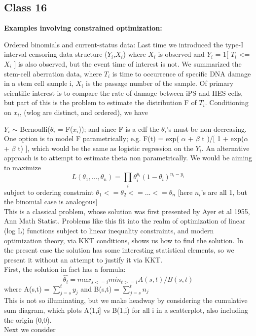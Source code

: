 \documentclass[11pt,a4paper]{article}
\begin{document}
\subsection*{Class 16}

\textbf{Examples involving constrained optimization:}


Ordered binomials and current-status data:  Last time we introduced the type-I interval censoring data structure { ($Y_i$,$X_i$) } where $X_i$ is observed and $Y_i$ = 1[ $T_i$ <= $X_i$ ] is also observed, but the event time of interest is not.  We summarized the stem-cell aberration data, where $T_i$ is time to occurrence of specific DNA damage in a stem cell sample i, $X_i$ is the passage number of the sample.  Of primary scientific interest is to compare the rate of damage between iPS and HES cells, but part of this is the problem to estimate the distribution F of $T_i$.   Conditioning on {$x_i$}, (wlog are distinct, and ordered), we have 

$Y_i$ $\sim$ Bernoulli($\theta_i$ = F($x_i$));  and since F is a cdf the $\theta_i$'s must be non-decreasing.\\

One option is to model F parametrically; e.g. F(t) = exp( $\alpha$ + $\beta$ t )/[ 1 + exp($\alpha$ + $\beta$ t) ], which would be the same as logistic regression on the $Y_i$.  An alternative approach is to attempt to estimate theta non parametrically.   We would be aiming to maximize 
\begin{equation}
L(\theta_1, ... ,\theta_n) = \prod_i  \theta_i^{y_i}  (1-\theta_i)^{n_i-y_i}
\end{equation}
 subject to ordering constraint  $\theta_1 <= \theta_2 <= ... <= \theta_n$  [here $n_i$'s are all 1, but the binomial case is analogous]\\
	
	This is a classical problem, whose solution was first presented by Ayer et al 1955, Ann Math Statist.   Problems like this fit into the realm of optimization of linear (log L) functions subject to linear inequality constraints, and modern optimization theory, via KKT conditions,  shows us how to find the solution.  In the present case the solution has some interesting statistical elements, so we present it without an attempt to justify it via KKT.  \\
	
	First, the solution in fact has a formula:
	\begin{equation}
		\hat{\theta_i} = max_{s <= i}min_{t >= i}  A(s,t)/B(s,t)
	\end{equation}
    where A(s,t) = $\sum_{j=s}^t  y_j$     and B(s,t) = $\sum_{j=s}^t n_j$       
	\\
	This is not so illuminating, but we make headway by considering the cumulative sum diagram, which plots   A(1,i]   vs B(1,i)  for all i in a scatterplot, also including the origin (0,0). \\ Next we consider
	
\end{document}
